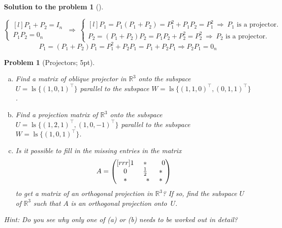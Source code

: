 \documentclass[12pt,a4]{article}
\newtheorem{problem}{Problem}
\newtheorem{solution}{Solution to the problem}
\newcommand\ls{\operatorname{ls}}
\newcommand{\bR}{{\mathbb R}}
\begin{document}
{\begin{solution}[]
\begin{enumerate}[(a)]
\[\left \{ \begin{matrix}[l]
P_1 + P_2 = I_n \\[5pt]
P_1P_2 = 0_n
\end{matrix}\right. 
~\Rightarrow~ 
\left \{ \begin{matrix}[l]
P_1 = P_1(P_1 + P_2) = P_1^2 + P_1P_2 = P_1^2
~\Rightarrow~ 
P_1 \text{ is a projector.} \\[5pt]
P_2 = (P_1 + P_2)P_2 = P_1P_2 + P_2^2 = P_2^2
~\Rightarrow~ 
P_2 \text{ is a projector.}
\end{matrix}\right. 
\]
\[
P_1 = (P_1 + P_2)P_1 = P_1^2 + P_2P_1 = P_1 + P_2P_1 \Rightarrow P_2P_1 = 0_n
\]
\end{enumerate}
\end{solution}
}


\begin{problem}[Projectors; 5pt]\label{prb:12.8}\rm
\begin{enumerate}[(a)]
	\item Find a matrix of oblique projector in $\bR^3$ onto the subspace $U =\ls \{(1,0,1)^\top\}$ parallel to the subspace $W = \ls\{(1,1,0)^\top, (0,1,1)^\top\}$.
	\item Find a projection matrix of $\bR^3$ onto the subspace $U =\ls \{(1,2,1)^\top,(1,0,-1)^\top \}$ parallel to the subspace $W = \ls\{(1,0,1)^\top\}$.
	\item
	Is it possible to fill in the missing entries in the matrix
	\[
	A = \begin{pmatrix}[rrr]
	1 & \ast & \hphantom{-}0 \\ 0 & \tfrac12 & \ast\\
	\ast & \hphantom{-}\ast & \ast
	\end{pmatrix}
	\]
	to get a matrix of an orthogonal projection in $\bR^3$? If so, find the subspace $U$ of $\bR^3$ such that $A$ is an orthogonal projection onto~$U$.
\end{enumerate}

	{\small \textsf{Hint:
		Do you see why only one of (a) or (b) needs to be worked out in detail?}}
\end{problem}
\end{document}
